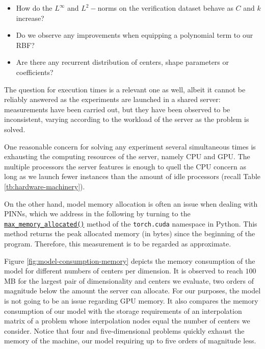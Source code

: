 \documentclass[12pt]{report} %
\begin{document}
\begin{itemize}
  \item How do the $L^\infty$ and $L^2-$norms on the verification dataset behave as $C$ and $k$ increase?
  \item Do we observe any improvements when equipping a polynomial term to our RBF?
  \item Are there any recurrent distribution of centers, shape parameters or coefficients?
\end{itemize}

The question for execution times is a relevant one as well, albeit it cannot be reliably answered as the experiments are launched in a shared server: measurements have been carried out, but they have been observed to be inconsistent, varying according to the workload of the server as the problem is solved.

One reasonable concern for solving any experiment several simultaneous times is exhausting the computing resources of the server, namely CPU and GPU. The multiple processors the server features is enough to quell the CPU concern as long as we launch fewer instances than the amount of idle processors (recall Table \ref{tb:hardware-machinery}).

On the other hand, model memory allocation is often an issue when dealing with PINNs, which we address in the following by turning to the \href{https://pytorch.org/docs/stable/generated/torch.cuda.max_memory_allocated.html}{\texttt{max\_memory\_allocated()}}
method of the \texttt{torch.cuda} namespace in Python. This method returns the peak allocated memory (in bytes) since the beginning of the program. Therefore, this
measurement is to be regarded as approximate. 

Figure \ref{fig:model-consumption-memory} depicts the memory consumption of the
model for different numbers of centers per dimension. It is observed to reach $100$ MB for the largest pair of dimensionality and centers we evaluate, two orders of magnitude below the amount the server can allocate. For our purposes, the model is not going to be an issue regarding GPU memory. It also compares the memory consumption of our model with the storage requirements of an interpolation matrix of a problem whose interpolation nodes equal the number of centers we consider. Notice that four and five-dimensional problems quickly exhaust the memory of the machine, our model requiring up to five orders of magnitude less.
\end{document}

